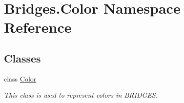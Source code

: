 \hypertarget{namespace_bridges_1_1_color}{}\section{Bridges.\+Color Namespace Reference}
\label{namespace_bridges_1_1_color}
\subsection*{Classes}
\begin{DoxyCompactItemize}
\item 
class \hyperlink{class_bridges_1_1_color_1_1_color}{Color}
\begin{DoxyCompactList}\small\item\em This class is used to represent colors in B\+R\+I\+D\+G\+E\+S. \end{DoxyCompactList}\end{DoxyCompactItemize}
